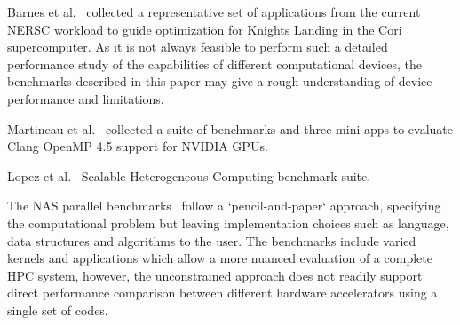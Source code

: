 \documentclass[../document.tex]{subfiles}
\begin{document}
\label{sec:related_work}

Barnes et al.~\cite{barnes2016evaluating} collected a representative set of applications from the current NERSC workload to guide optimization for Knights Landing in the Cori supercomputer.
As it is not always feasible to perform such a detailed performance study of the capabilities of different computational devices, the benchmarks described in this paper may give a rough understanding of device performance and limitations.

Martineau et al.~\cite{martineau2016performance} collected a suite of benchmarks and three mini-apps to evaluate Clang OpenMP 4.5 support for NVIDIA GPUs.

Lopez et al.~\cite{lopez2015examining} Scalable Heterogeneous Computing benchmark suite.

The NAS parallel benchmarks~\cite{bailey1991parallel} follow a `pencil-and-paper` approach, specifying the computational problem but leaving implementation choices such as language, data structures and algorithms to the user.
The benchmarks include varied kernels and applications which allow a more nuanced evaluation of a complete HPC system, however, the unconstrained approach does not readily support direct performance comparison between different hardware accelerators using a single set of codes.
\end{document}
